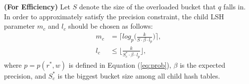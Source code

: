 \begin{prop}
\label{prop:efficiency}
\textbf{(For Efficiency)} Let $S$ denote the size of the overloaded bucket that $q$ falls in. In order to approximately satisfy the precision constraint, the child LSH parameter $m_c$ and $l_c$ should be chosen as follows:
\begin{equation}\label{eq:forefficiency}
\begin{aligned}
    m_c&=\Big\lceil log_{p}\Big(\frac{k}{S\cdot\beta\cdot l_p}\Big)\Big\rceil,\\
    l_c&\leq\Big\lfloor\frac{k}{S_c^*\cdot\beta\cdot l_p}\Big\rfloor,
\end{aligned}
\end{equation}
where $p=p(r^*,w)$ is defined in Equation (\ref{eq:prob}), $\beta$ is the expected precision, and $S_c^*$ is the biggest bucket size among all child hash tables.
\end{prop}

